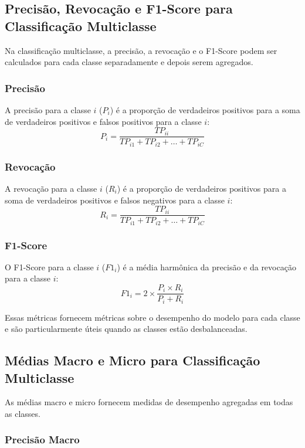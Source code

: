 \subsection{Precisão, Revocação e F1-Score para Classificação Multiclasse}

Na classificação multiclasse, a precisão, a revocação e o F1-Score podem ser calculados para cada classe separadamente e depois serem agregados.

\subsubsection{Precisão}

A precisão para a classe \(i\) (\(P_i\)) é a proporção de verdadeiros positivos para a soma de verdadeiros positivos e falsos positivos para a classe \(i\):
\[ P_i = \frac{TP_{ii}}{TP_{i1} + TP_{i2} + \ldots + TP_{iC}} \]

\subsubsection{Revocação}

A revocação para a classe \(i\) (\(R_i\)) é a proporção de verdadeiros positivos para a soma de verdadeiros positivos e falsos negativos para a classe \(i\):
\[ R_i = \frac{TP_{ii}}{TP_{i1} + TP_{i2} + \ldots + TP_{iC}} \]

\subsubsection{F1-Score}

O F1-Score para a classe \(i\) (\(F1_i\)) é a média harmônica da precisão e da revocação para a classe \(i\):
\[ F1_i = 2 \times \frac{P_i \times R_i}{P_i + R_i} \]

Essas métricas fornecem métricas sobre o desempenho do modelo para cada classe e são particularmente úteis quando as classes estão desbalanceadas.

\subsection{Médias Macro e Micro para Classificação Multiclasse}

As médias macro e micro fornecem medidas de desempenho agregadas em todas as classes.

\subsubsection{Precisão Macro}

